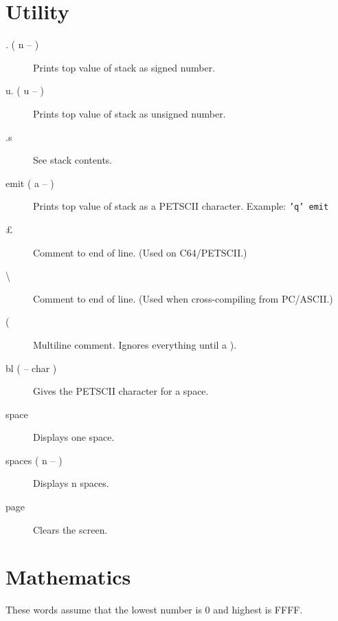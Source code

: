 \section{Utility}

\begin{description}
\item[. ( n -- )] Prints top value of stack as signed number.
\item[u. ( u -- )] Prints top value of stack as unsigned number.
\item[.s] See stack contents.
\item[emit ( a -- )] Prints top value of stack as a PETSCII character. Example: \texttt{'q' emit}
\item[\pounds] Comment to end of line. (Used on C64/PETSCII.)
\item[\textbackslash] Comment to end of line. (Used when cross-compiling from PC/ASCII.)
\item[(] Multiline comment. Ignores everything until a ).
\item[bl ( -- char )] Gives the PETSCII character for a space.
\item[space] Displays one space.
\item[spaces ( n -- )] Displays n spaces.
\item[page] Clears the screen.
\end{description}

\section{Mathematics}

These words assume that the lowest number is 0 and highest is FFFF.

